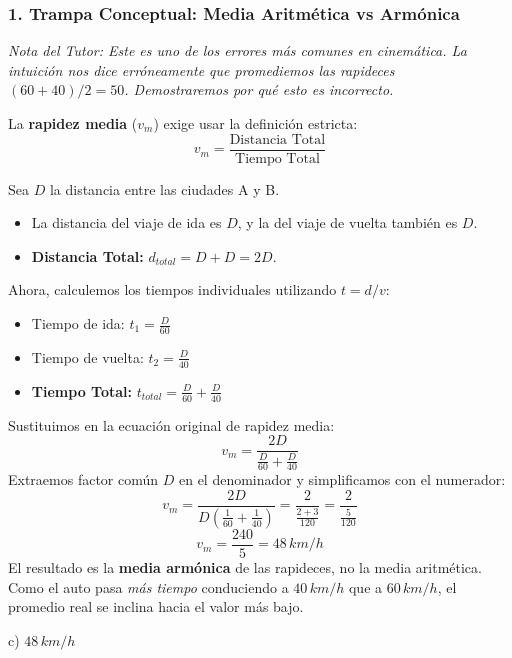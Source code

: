 \documentclass[12pt, a4paper]{article}
\begin{document}
\subsubsection*{1. Trampa Conceptual: Media Aritmética vs Armónica}
\textit{Nota del Tutor: Este es uno de los errores más comunes en cinemática. La intuición nos dice erróneamente que promediemos las rapideces $(60+40)/2 = 50$. Demostraremos por qué esto es incorrecto.}

La \textbf{rapidez media} ($v_m$) exige usar la definición estricta:
$$ v_m = \frac{\text{Distancia Total}}{\text{Tiempo Total}} $$

Sea $D$ la distancia entre las ciudades A y B. 
\begin{itemize}
    \item La distancia del viaje de ida es $D$, y la del viaje de vuelta también es $D$.
    \item \textbf{Distancia Total:} $d_{total} = D + D = 2D$.
\end{itemize}

Ahora, calculemos los tiempos individuales utilizando $t = d/v$:
\begin{itemize}
    \item Tiempo de ida: $t_1 = \frac{D}{60}$
    \item Tiempo de vuelta: $t_2 = \frac{D}{40}$
    \item \textbf{Tiempo Total:} $t_{total} = \frac{D}{60} + \frac{D}{40}$
\end{itemize}

Sustituimos en la ecuación original de rapidez media:
$$ v_m = \frac{2D}{\frac{D}{60} + \frac{D}{40}} $$
Extraemos factor común $D$ en el denominador y simplificamos con el numerador:
$$ v_m = \frac{2D}{D \left(\frac{1}{60} + \frac{1}{40}\right)} = \frac{2}{\frac{2 + 3}{120}} = \frac{2}{\frac{5}{120}} $$
$$ v_m = \frac{240}{5} = 48\,\si{km/h} $$
El resultado es la \textbf{media armónica} de las rapideces, no la media aritmética. Como el auto pasa \textit{más tiempo} conduciendo a $40\,\si{km/h}$ que a $60\,\si{km/h}$, el promedio real se inclina hacia el valor más bajo.

\begin{tcolorbox}[colback=green!5!white, colframe=green!50!black, title=Respuesta Final]
\centering \Large c) $48\,\si{km/h}$
\end{tcolorbox}

\newpage
\end{document}
